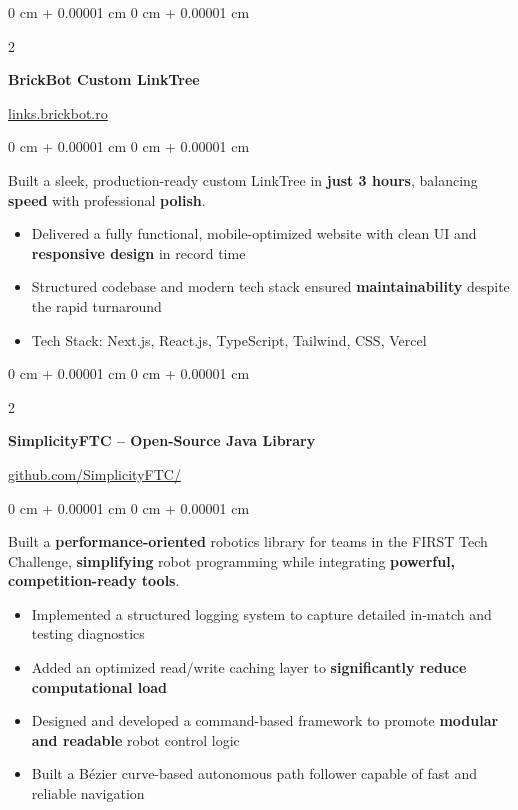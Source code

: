 \documentclass[10pt, letterpaper]{article}
\newenvironment{highlights}{
    \begin{itemize}[
        topsep=0.10 cm,
        parsep=0.10 cm,
        partopsep=0pt,
        itemsep=0pt,
        leftmargin=0 cm + 10pt
    ]
}{
    \end{itemize}
} %
\newenvironment{onecolentry}{
    \begin{adjustwidth}{
        0 cm + 0.00001 cm
    }{
        0 cm + 0.00001 cm
    }
}{
    \end{adjustwidth}
} %
\newenvironment{twocolentry}[2][]{
    \onecolentry
    \def\secondColumn{#2}
    \setcolumnwidth{\fill, 4.5 cm}
    \begin{paracol}{2}
}{
    \switchcolumn \raggedleft \secondColumn
    \end{paracol}
    \endonecolentry
} %
\begin{document}
\begin{twocolentry}{
    \href{https://links.brickbot.ro}{links.brickbot.ro}
}
    \textbf{BrickBot Custom LinkTree}
\end{twocolentry}
\vspace{0.10 cm}
\begin{onecolentry}
    Built a sleek, production-ready custom LinkTree in \textbf{just 3 hours}, balancing \textbf{speed} with professional \textbf{polish}. 
    \begin{highlights}
        \item Delivered a fully functional, mobile-optimized website with clean UI and \textbf{responsive design} in record time 
        \item Structured codebase and modern tech stack ensured \textbf{maintainability} despite the rapid turnaround
        \item Tech Stack: Next.js, React.js, TypeScript, Tailwind, CSS, Vercel
    \end{highlights}
\end{onecolentry}

\vspace{0.2 cm}

\begin{twocolentry}{
    \href{https://github.com/SimplicityFTC/SimplicityFTC-Quickstart}{github.com/SimplicityFTC/}
}
    \textbf{SimplicityFTC --  Open-Source Java Library}
\end{twocolentry}
\vspace{0.10 cm}
\begin{onecolentry}
    Built a \textbf{performance-oriented} robotics library for teams in the FIRST Tech Challenge, \textbf{simplifying} robot programming while integrating \textbf{powerful, competition-ready tools}.
   \begin{highlights}
    \item Implemented a structured logging system to capture detailed in-match and testing diagnostics
    \item Added an optimized read/write caching layer to \textbf{significantly reduce computational load}
    \item Designed and developed a command-based framework to promote \textbf{modular and readable} robot control logic
    \item Built a Bézier curve-based autonomous path follower capable of fast and reliable navigation
\end{highlights}

\end{onecolentry}
    
\end{document}
